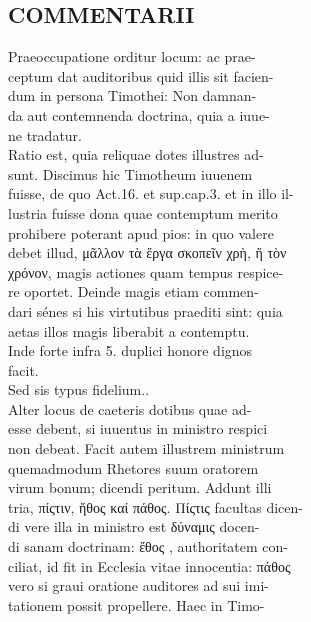 \documentclass{article}
\begin{document}
\begin{pages}
\section*{COMMENTARII \\
                }Praeoccupatione orditur locum: ac prae- \\
                ceptum dat auditoribus quid illis sit facien- \\
                dum in persona Timothei: Non damnan- \\
                da aut contemnenda doctrina, quia a iuue- \\
                ne tradatur. \\
                Ratio est, quia reliquae dotes illustres ad- \\
                sunt. Discimus hic Timotheum iuuenem \\
                fuisse, de quo Act.16. et sup.cap.3. et in illo il- \\
                lustria fuisse dona quae contemptum merito \\
                prohibere poterant apud pios: in quo valere \\
                debet illud, μᾶλλον τὰ ἔργα σκοπεῖν χρὴ, ἤ τὸν \\
                χρόνον, magis actiones quam tempus respice- \\
                re oportet. Deinde magis etiam commen- \\
                dari sénes si his virtutibus praediti sint: quia \\
                aetas illos magis liberabit a contemptu. \\
                Inde forte infra 5. duplici honore dignos \\
                facit. \\
                Sed sis typus fidelium.. \\
                Alter locus de caeteris dotibus quae ad- \\
                esse debent, si iuuentus in ministro respici \\
                non debeat. Facit autem illustrem ministrum \\
                quemadmodum Rhetores suum oratorem \\
                virum bonum; dicendi peritum. Addunt illi \\
                tria, πίςτιν, ἤθος καί πάθος. Πίςτις facultas dicen- \\
                di vere illa in ministro est δύναμις docen- \\
                di sanam doctrinam:  ἔθος , authoritatem con- \\
                ciliat, id fit in Ecclesia vitae innocentia: πάθος \\
                vero si graui oratione auditores ad sui imi- \\
                tationem possit propellere. Haec in Timo- \\
                

\end{pages}
\end{document}

